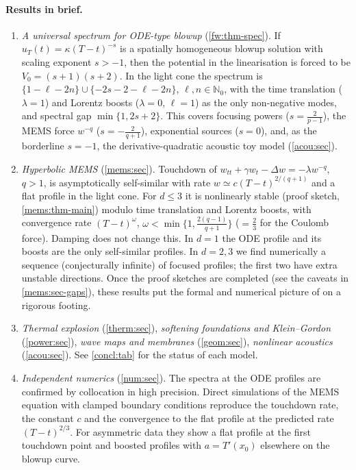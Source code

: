 \paragraph{Results in brief.}
\begin{enumerate}[leftmargin=1.5em]
\item \emph{A universal spectrum for ODE-type blowup} (\cref{fw:thm-spec}).
If $u_T(t)=\kappa(T-t)^{-s}$ is a spatially homogeneous blowup solution with
scaling exponent $s>-1$, then the potential in the linearisation is forced
to be $V_0=(s+1)(s+2)$. In the light cone the spectrum is
$\{1-\ell-2n\}\cup\{-2s-2-\ell-2n\}$, $\ell,n\in\mathbb N_0$, with the time
translation ($\lambda=1$) and Lorentz boosts ($\lambda=0$, $\ell=1$) as the
only non-negative modes, and spectral gap $\min\{1,2s+2\}$. This covers
focusing powers ($s=\frac2{p-1}$), the MEMS force $w^{-q}$ ($s=-\frac2{q+1}$),
exponential sources ($s=0$), and, as the borderline $s=-1$, the
derivative-quadratic acoustic toy model (\cref{acou:sec}).
\item \emph{Hyperbolic MEMS} (\cref{mems:sec}). Touchdown of
$w_{tt}+\gamma w_t-\Delta w=-\lambda w^{-q}$, $q>1$, is asymptotically
self-similar with rate $w\simeq c(T-t)^{2/(q+1)}$ and a flat profile in the
light cone. For $d\le3$ it is nonlinearly stable (proof sketch,
\cref{mems:thm-main}) modulo time translation and Lorentz
boosts, with convergence rate $(T-t)^{\omega}$, $\omega<\min\{1,\frac{2(q-1)}{q+1}\}$
($=\frac23$ for the Coulomb force). Damping does not change this. In $d=1$ the
ODE profile and its boosts are the only self-similar profiles. In $d=2,3$ we
find numerically a sequence (conjecturally infinite) of focused profiles;
the first two have extra unstable directions. Once the proof sketches are
completed (see the caveats in \cref{mems:sec-gaps}), these results put the
formal and numerical picture of \cite{GimperleinHeLacey2022,He2021} on a
rigorous footing.
\item \emph{Thermal explosion} (\cref{therm:sec}), \emph{softening
foundations and Klein--Gordon} (\cref{power:sec}), \emph{wave maps and
membranes} (\cref{geom:sec}), \emph{nonlinear acoustics}
(\cref{acou:sec}). See \cref{concl:tab} for the status of each model.
\item \emph{Independent numerics} (\cref{num:sec}). The spectra at the ODE
profiles are confirmed by collocation in high precision. Direct simulations of the MEMS equation
with clamped boundary conditions reproduce the touchdown rate, the constant
$c$ and the convergence to the flat profile at the predicted rate
$(T-t)^{2/3}$. For asymmetric data they show a flat profile at the first touchdown
point and boosted profiles with $a=T'(x_0)$ elsewhere on the blowup curve.
\end{enumerate}

